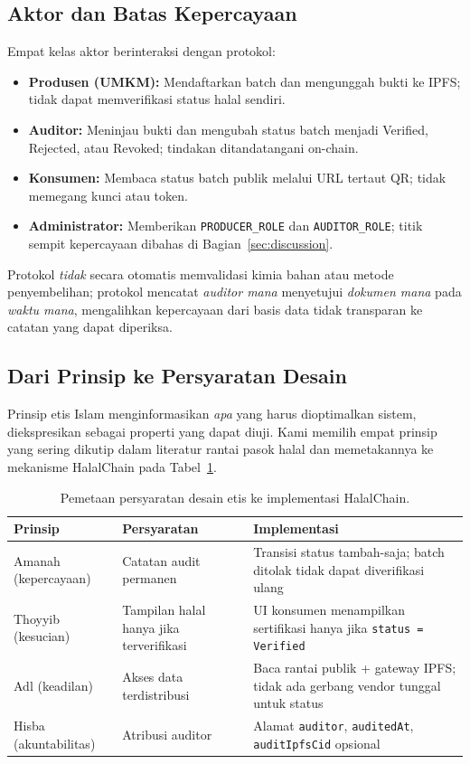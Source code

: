 \subsection{Aktor dan Batas Kepercayaan}
Empat kelas aktor berinteraksi dengan protokol:
\begin{itemize}
  \item \textbf{Produsen (UMKM):} Mendaftarkan batch dan mengunggah bukti ke IPFS; tidak dapat memverifikasi status halal sendiri.
  \item \textbf{Auditor:} Meninjau bukti dan mengubah status batch menjadi Verified, Rejected, atau Revoked; tindakan ditandatangani on-chain.
  \item \textbf{Konsumen:} Membaca status batch publik melalui URL tertaut QR; tidak memegang kunci atau token.
  \item \textbf{Administrator:} Memberikan \texttt{PRODUCER\_ROLE} dan \texttt{AUDITOR\_ROLE}; titik sempit kepercayaan dibahas di Bagian~\ref{sec:discussion}.
\end{itemize}
Protokol \emph{tidak} secara otomatis memvalidasi kimia bahan atau metode penyembelihan; protokol mencatat \emph{auditor mana} menyetujui \emph{dokumen mana} pada \emph{waktu mana}, mengalihkan kepercayaan dari basis data tidak transparan ke catatan yang dapat diperiksa.

\subsection{Dari Prinsip ke Persyaratan Desain}
Prinsip etis Islam menginformasikan \emph{apa} yang harus dioptimalkan sistem, diekspresikan sebagai properti yang dapat diuji.
Kami memilih empat prinsip yang sering dikutip dalam literatur rantai pasok halal dan memetakannya ke mekanisme HalalChain pada Tabel~\ref{tab:ethics}.

\begin{table}[t]
  \caption{Pemetaan persyaratan desain etis ke implementasi HalalChain.}
  \label{tab:ethics}
  \centering
  \footnotesize
  \setlength{\tabcolsep}{3pt}
  \begin{tabularx}{\columnwidth}{@{}>{\raggedright\arraybackslash}p{}>{\raggedright\arraybackslash}p{}X@{}}
    \toprule
    \textbf{Prinsip} & \textbf{Persyaratan} & \textbf{Implementasi} \\
    \midrule
    Amanah (kepercayaan) & Catatan audit permanen & Transisi status tambah-saja; batch ditolak tidak dapat diverifikasi ulang \\
    Thoyyib (kesucian) & Tampilan halal hanya jika terverifikasi & UI konsumen menampilkan sertifikasi hanya jika \texttt{status = Verified} \\
    Adl (keadilan) & Akses data terdistribusi & Baca rantai publik + gateway IPFS; tidak ada gerbang vendor tunggal untuk status \\
    Hisba (akuntabilitas) & Atribusi auditor & Alamat \texttt{auditor}, \texttt{auditedAt}, \texttt{auditIpfsCid} opsional \\
    \bottomrule
  \end{tabularx}
\end{table}

